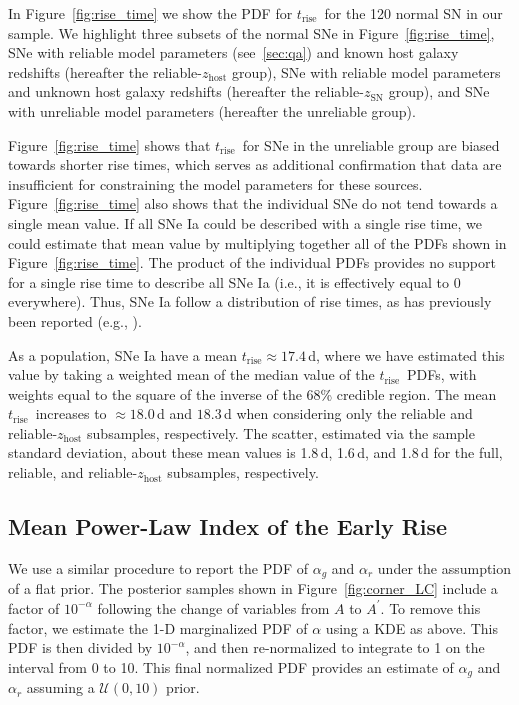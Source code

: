 \documentclass[twocolumn]{./aastex63}
\newcommand{\trise}{$t_\mathrm{rise}$}
\begin{document}
In Figure~\ref{fig:rise_time} we show the PDF for \trise\ for the 120 normal
SN in our sample. We highlight three subsets of the normal SNe in
Figure~\ref{fig:rise_time}, SNe with reliable model parameters (see~\ref{sec:qa}) and known host galaxy redshifts (hereafter the
reliable-$z_\mathrm{host}$ group), SNe with reliable model parameters and
unknown host galaxy redshifts (hereafter the reliable-$z_\mathrm{SN}$ group),
and SNe with unreliable model parameters (hereafter the unreliable group). 

Figure~\ref{fig:rise_time} shows that \trise\ for SNe in the unreliable group
are biased towards shorter rise times, which serves as additional
confirmation that data are insufficient for constraining the model parameters
for these sources. Figure~\ref{fig:rise_time} also shows that the individual
SNe do not tend towards a single mean value. If all SNe Ia could be described
with a single rise time, we could estimate that mean value by multiplying
together all of the PDFs shown in Figure~\ref{fig:rise_time}. The product of
the individual PDFs provides no support for a single rise time to describe
all SNe Ia (i.e., it is effectively equal to 0 everywhere). Thus, SNe Ia
follow a distribution of rise times, as has previously been reported (e.g.,
\citealt{Riess99a,Ganeshalingam11,Firth15,Zheng17a}).

As a population, SNe Ia have a mean \trise$ \approx 17.4$\,d, where we have
estimated this value by taking a weighted mean of the median value of the
\trise\ PDFs, with weights equal to the square of the inverse of the 68\%
credible region. The mean \trise\ increases to $\approx 18.0$\,d and
$18.3$\,d when considering only the reliable and reliable-$z_\mathrm{host}$
subsamples, respectively. The scatter, estimated via the sample standard
deviation, about these mean values is 1.8\,d, 1.6\,d, and 1.8\,d for the
full, reliable, and reliable-$z_\mathrm{host}$ subsamples, respectively.

\subsection{Mean Power-Law Index of the Early Rise}

We use a similar procedure to report the PDF of $\alpha_g$ and $\alpha_r$
under the assumption of a flat prior. The posterior samples shown in
Figure~\ref{fig:corner_LC} include a factor of $10^{-\alpha}$ following the
change of variables from $A$ to $A^\prime$. To remove this factor, we
estimate the 1-D marginalized PDF of $\alpha$ using a KDE as above. This PDF
is then divided by $10^{-\alpha}$, and then re-normalized to integrate to 1
on the interval from 0 to 10. This final normalized PDF provides an estimate
of $\alpha_g$ and $\alpha_r$ assuming a $\mathcal{U}(0,10)$ prior.
\end{document}
